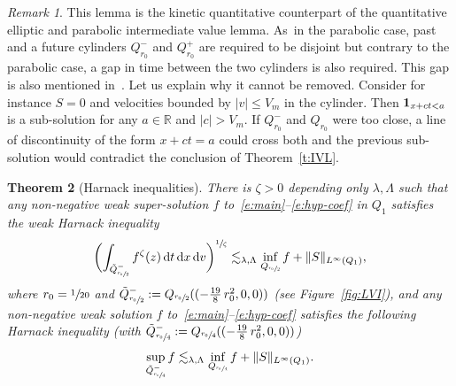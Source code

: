 \documentclass[10pt]{amsart}
\newtheorem{theorem}{Theorem}
\theoremstyle{definition}
\theoremstyle{remark}
\newtheorem{remark}[theorem]{Remark}
\newcommand{\dd}{{\, \mathrm d}}
\begin{document}
\begin{remark}
\label{rem:gap}
This lemma is the kinetic quantitative counterpart of the
quantitative elliptic \cite{DG56,DG57,vasseur} and parabolic
\cite{gueDGhalv2} intermediate value lemma. As~in the
parabolic case, past and a future cylinders $Q_{r_0}^{-}$ and
$Q_{r_0}^{+}$ are required to be disjoint but contrary to the
parabolic case, a gap in time between the two cylinders is also
required. This gap is also mentioned in~\cite{gimv,AP20}. Let
us explain why it cannot be removed. Consider for instance
$S=0$ and velocities bounded by $|v| \le V_m$ in the
cylinder. Then ${\bf 1}_{x+ct<a}$ is a sub-solution for any
$a\in \mathbb{R}$ and $|c|>V_m$. If $Q_{r_0}^{-}$ and $Q_{r_0}$
were too close, a line of discontinuity of the form $x+ct=a$
could cross both and the previous sub-solution would contradict
the conclusion of Theorem~\ref{t:IVL}.
\end{remark}

\begin{theorem}[Harnack inequalities]
\label{t:harnack}
There is $\zeta >0$ depending only $\lambda,\Lambda$ such that
any non-negative weak super-solution $f$
to~\eqref{e:main}--\eqref{e:hyp-coef} in $Q_1$ satisfies the
weak Harnack inequality\vspace*{-3pt}
\begin{equation}
\label{eq:w-Harnack-stat}
\biggl( \int_{\tilde Q_{\sfrac{r_0}{2}}^-} f^\zeta (z) \dd t \dd x \dd v
\biggr)^{\sfrac{1}{\zeta}}
\lesssim_{\lambda,\Lambda} \inf_{ Q_{\sfrac{r_0}{2}}}f
+ \|S\|_{L^\infty (Q_1)},
\end{equation}
where $r_0=\sfrac{1}{20}$ and
$\tilde Q_{\sfrac{r_0}{2}}
^{-}:=Q_{\sfrac{r_0}{2}}((-\frac{19}{8}\,r_0^2,0,0))$ (see
Figure~\ref{fig:LVI}), and any non-negative weak solution $f$
to~\eqref{e:main}--\eqref{e:hyp-coef} satisfies the following
Harnack inequality (with
$\tilde
Q_{\sfrac{r_0}{4}}^{-}:=Q_{\sfrac{r_0}{4}}((-\frac{19}{8}\,r_0^2,0,0))$)\vspace*{-3pt}
\begin{equation}
\label{eq:s-Harnack-stat}
\sup_{\tilde Q_{\sfrac{r_0}{4}}^{-}} f \lesssim_{\lambda,\Lambda}
\inf_{Q_{\sfrac{r_0}{4}}} f + \| S \|_{L^\infty(Q_1)}.
\end{equation}
\end{theorem}
\end{document}
